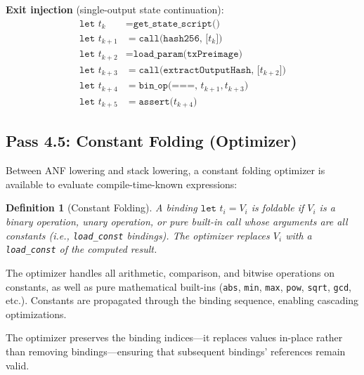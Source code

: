 \documentclass[11pt,a4paper]{article}
\newtheorem{definition}[theorem]{Definition}
\begin{document}
\textbf{Exit injection} (single-output state continuation):
\begin{align*}
  \texttt{let } t_k &= \texttt{get\_state\_script()} \\
  \texttt{let } t_{k+1} &= \texttt{call(hash256, [}t_k\texttt{])} \\
  \texttt{let } t_{k+2} &= \texttt{load\_param(txPreimage)} \\
  \texttt{let } t_{k+3} &= \texttt{call(extractOutputHash, [}t_{k+2}\texttt{])} \\
  \texttt{let } t_{k+4} &= \texttt{bin\_op(===, }t_{k+1}, t_{k+3}\texttt{)}  \\
  \texttt{let } t_{k+5} &= \texttt{assert(}t_{k+4}\texttt{)}
\end{align*}

\subsection{Pass 4.5: Constant Folding (Optimizer)}
\label{sec:pass-optimize}

Between ANF lowering and stack lowering, a constant folding optimizer is
available to evaluate compile-time-known expressions:

\begin{definition}[Constant Folding]
A binding $\texttt{let } t_i = V_i$ is \emph{foldable} if $V_i$ is a
binary operation, unary operation, or pure built-in call whose arguments
are all constants (i.e., \texttt{load\_const} bindings). The optimizer
replaces $V_i$ with a \texttt{load\_const} of the computed result.
\end{definition}

The optimizer handles all arithmetic, comparison, and bitwise operations on
constants, as well as pure mathematical built-ins (\texttt{abs}, \texttt{min},
\texttt{max}, \texttt{pow}, \texttt{sqrt}, \texttt{gcd}, etc.). Constants
are propagated through the binding sequence, enabling cascading optimizations.

The optimizer preserves the binding indices---it replaces values in-place
rather than removing bindings---ensuring that subsequent bindings' references
remain valid.
\end{document}
